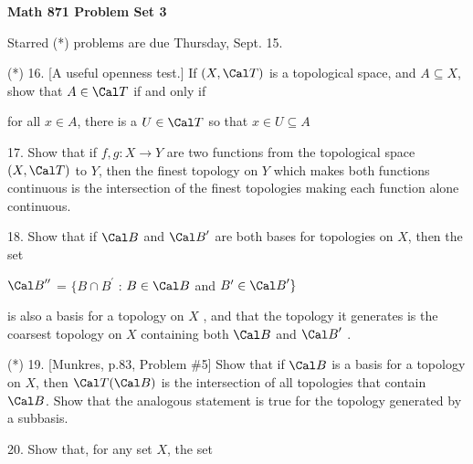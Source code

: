 


\def\ctln{\centerline}
\def\msk{\medskip}
\def\bsk{\bigskip}
\def\ssk{\smallskip}
\def\ra{\rightarrow}
\def\ubr{\underbar}

\UseAMSsymbols

\ctln{\bf Math 871 Problem Set 3}

\msk

Starred (*) problems are due Thursday, Sept. 15.

\bsk

\item{(*)} 16. [A useful openness test.] If $(X,{\Cal T})$ is a topological space, 
and $A\subseteq X$,  show that $A\in {\Cal T}$ if and only if

\ssk

\ctln{for all $x\in A$, there is a $U\in {\Cal T}$ so that $x\in U\subseteq A$}

\msk

\item{17.} Show that if $f,g:X\ra Y$ are two functions from the topological
space $(X,{\Cal T})$ to $Y$, then the finest topology on $Y$ which makes
both functions continuous is the intersection of the finest topologies
making each function alone continuous.

\msk

\item{18.} Show that if ${\Cal B}$ and ${\Cal B}^\prime$ are both bases for topologies on $X$,
then the set

\smallskip

\centerline{${\Cal B}^{\prime\prime}$ = $\{B\cap B^\prime$ : $B\in{\Cal B}$ and $B^\prime\in{\Cal B}^\prime\}$}

\smallskip

\item{} is also a basis for a topology on $X$ , and that the topology it generates is the 
coarsest topology on $X$ containing both ${\Cal B}$ and ${\Cal B}^\prime$ .

\msk

\item{(*)} 19. [Munkres, p.83, Problem \#5] Show that if ${\Cal B}$ is a basis for a 
topology on $X$, then ${\Cal T}({\Cal B})$ is the intersection of all topologies 
that contain ${\Cal B}$. Show that the analogous statement is true for the topology
generated by a subbasis.

\msk

\item{20.} Show that, for any set $X$, the set

